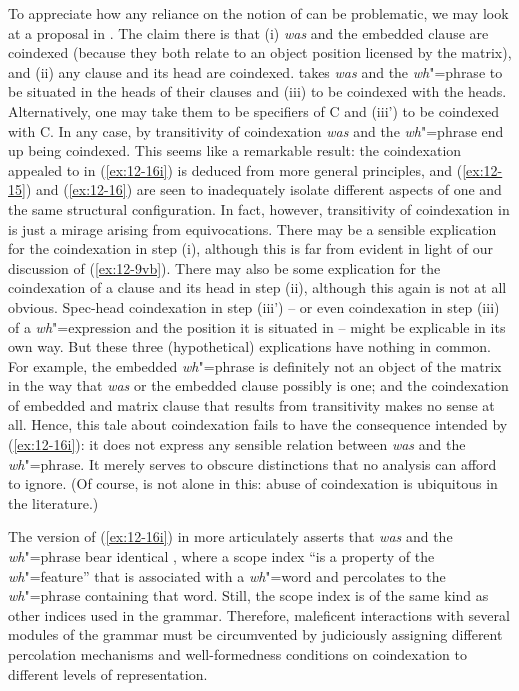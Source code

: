 \documentclass[output=paper]{langsci/langscibook}
\begin{document}
To appreciate how any reliance on the notion of  can be
problematic, we may look at a proposal in \citet[106]{Hiemstra1986}.  The
claim there is that (i) \textit{was} and the embedded clause are
coindexed (because they both relate to an object position licensed by
the matrix), and (ii) any clause and its head are coindexed. \citet{Hiemstra1986} takes \textit{was} and the \emph{wh}"=phrase to be situated in
the heads of their clauses and (iii) to be coindexed with the heads.
Alternatively, one may take them to be specifiers of C and (iii') to
be coindexed with C. In any case, by transitivity of coindexation \textit{was} and the \emph{wh}"=phrase end up being coindexed. This seems
like a remarkable result: the coindexation appealed to in (\ref{ex:12-16i}) is
deduced from more general principles, and (\ref{ex:12-15}) and (\ref{ex:12-16}) are seen to
inadequately isolate different aspects of one and the same structural
configuration. In fact, however, transitivity of coindexation in
\citet{Hiemstra1986} is just a mirage arising from equivocations.  There
may be a sensible explication for the coindexation in step (i),
although this is far from evident in light of our discussion of
(\ref{ex:12-9vb}). There may also be some explication for the coindexation of a
clause and its head in step (ii), although this again is not at all
obvious. Spec-head coindexation in step (iii') -- or even coindexation
in step (iii) of a \emph{wh}"=expression and the position it is
situated in -- might be explicable in its own way. But these three
(hypothetical) explications have nothing in common. For example, the
embedded \emph{wh}"=phrase is definitely not an object of the matrix
in the way that \textit{was} or the embedded clause possibly is one;
and the coindexation of embedded and matrix clause that results from
transitivity makes no sense at all. Hence, this tale about
coindexation fails to have the consequence intended by (\ref{ex:12-16i}): it does
not express any sensible relation between \textit{was} and the \emph{wh}"=phrase. It merely serves to obscure distinctions that no
analysis can afford to ignore.  (Of course, \citet{Hiemstra1986} is not
alone in this: abuse of coindexation is ubiquitous in the literature.)

The version of (\ref{ex:12-16i}) in \citet{Riemsdijk1982} more articulately asserts
that \textit{was} and the \emph{wh}"=phrase bear identical , where a scope index ``is a property of the \emph{wh}"=feature'' that is associated with a \emph{wh}"=word and
percolates to the \emph{wh}"=phrase containing that word. Still, the
scope index is of the same kind as other indices used in the
grammar. Therefore, maleficent interactions with several modules of
the grammar must be circumvented by judiciously assigning different
percolation mechanisms and well-formedness conditions on coindexation
to different levels of representation.
\end{document}
